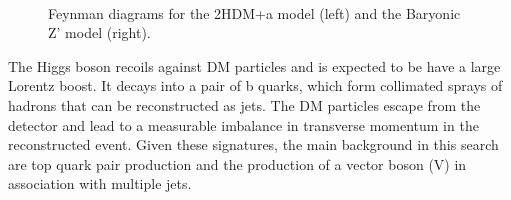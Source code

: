 \begin{figure}
\centering
 \hspace{1cm}
  \\
\caption{Feynman diagrams for the 2HDM+a model (left) and the Baryonic Z' model (right).}
\label{feyns}
\end{figure}





The Higgs boson recoils against DM particles and is expected to be
have a large Lorentz boost. It decays into a pair of b quarks, which
form collimated sprays of hadrons that can be
reconstructed as jets. The DM particles escape from the detector and
lead to a measurable imbalance in transverse momentum in the
reconstructed event. Given these signatures, the main background in
this search are top quark pair production and the production of a vector boson (V) in association with multiple jets. %
